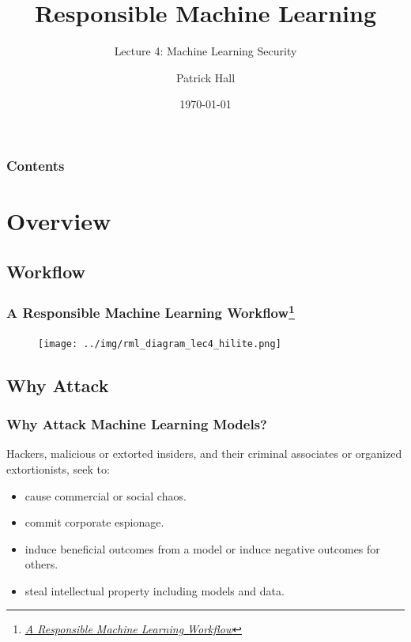 \documentclass[11pt,
               aspectratio=169,
               hyperref={colorlinks}
               ]{beamer}
\author{Patrick Hall}
\title{Responsible Machine Learning}
\subtitle{Lecture 4: Machine Learning Security}
\institute{The George Washington University}
\date{\today}
\begin{document}
	
	\maketitle
	
	\begin{frame}
	
		\frametitle{Contents}
		
		\tableofcontents{}
		
	\end{frame}
	
	
	\section{Overview}
		\subsection{Workflow} %
			
		\begin{frame}
		
			\frametitle{A Responsible Machine Learning Workflow\footnote{\href{https://www.mdpi.com/2078-2489/11/3/137/htm}{\textit{A Responsible Machine Learning Workflow}}}}
			
			\begin{figure}[htb]
				\begin{center}
					\texttt{[image: ../img/rml\_diagram\_lec4\_hilite.png]}
					\label{fig:blueprint}
				\end{center}
			\end{figure}		
					
		\end{frame}	


		\subsection{Why Attack}

		\begin{frame}
		
			\frametitle{Why Attack Machine Learning Models?}
Hackers, malicious or extorted insiders, and their criminal associates or organized extortionists, seek to:
				\begin{itemize}
					\item cause commercial or social chaos.
					\item commit corporate espionage.
					\item induce beneficial outcomes from a model or induce negative outcomes for others. %
					\item steal intellectual property including models and data.
				\end{itemize}	
			\end{frame}
\end{document}

